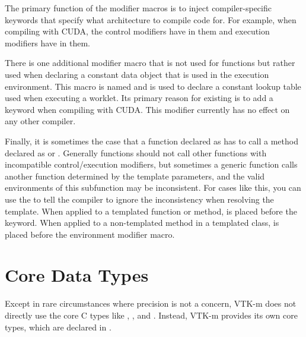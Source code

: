 
The primary function of the modifier macros is to inject compiler-specific
keywords that specify what architecture to compile code for. For example,
when compiling with CUDA, the control modifiers have
 in them and execution modifiers
have  in them.

There is one additional modifier macro that is not used for functions but
rather used when declaring a constant data object that is used in the
execution environment. This macro is named
and is used to declare a constant lookup table used when executing a
worklet. Its primary reason for existing is to add a
 keyword when compiling with CUDA. This modifier
currently has no effect on any other compiler.

Finally, it is sometimes the case that a function declared as
\vtkmexeccontmodifier has to call a method declared as \vtkmexecmodifier or
\vtkmcontmodifier. Generally functions should not call other functions with
incompatible control/execution modifiers, but sometimes a generic
\vtkmexeccontmodifier function calls another function determined by the
template parameters, and the valid environments of this subfunction may be
inconsistent. For cases like this, you can use the
 to tell the compiler to ignore the
inconsistency when resolving the template. When applied to a templated
function or method,  is placed
before the  keyword. When applied to a non-templated
method in a templated class,  is
placed before the environment modifier macro.



\section{Core Data Types}
\label{sec:CoreDataTypes}

Except in rare circumstances where precision is not a concern, VTK-m does
not directly use the core C types like , ,
and . Instead, VTK-m provides its own core types, which
are declared in .

